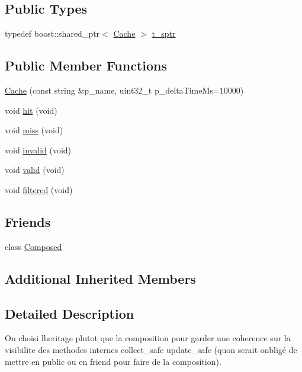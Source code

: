 \subsection*{Public Types}
\begin{DoxyCompactItemize}
\item 
typedef boost\+::shared\+\_\+ptr$<$ \hyperlink{classxtd_1_1counters_1_1Cache}{Cache} $>$ \hyperlink{classxtd_1_1counters_1_1Cache_ad248c57507dbfd4b90332551fd0d5f1b}{t\+\_\+sptr}
\end{DoxyCompactItemize}
\subsection*{Public Member Functions}
\begin{DoxyCompactItemize}
\item 
\hyperlink{classxtd_1_1counters_1_1Cache_a73df8a43eff5fd364e41dccabc562d54}{Cache} (const string \&p\+\_\+name, uint32\+\_\+t p\+\_\+delta\+Time\+Ms=10000)
\item 
void \hyperlink{classxtd_1_1counters_1_1Cache_a57101c273f95f2cf4d5a71627f0b23de}{hit} (void)
\item 
void \hyperlink{classxtd_1_1counters_1_1Cache_a71c25293724fa534633e6d5c9f2cc36d}{miss} (void)
\item 
void \hyperlink{classxtd_1_1counters_1_1Cache_a419b5620c93818158193cb6aca015c9b}{invalid} (void)
\item 
void \hyperlink{classxtd_1_1counters_1_1Cache_a42ea3f207a0399b1864f3ee918e8a0e4}{valid} (void)
\item 
void \hyperlink{classxtd_1_1counters_1_1Cache_a827a66e44b127d38c5f808fa38a2535a}{filtered} (void)
\end{DoxyCompactItemize}
\subsection*{Friends}
\begin{DoxyCompactItemize}
\item 
class \hyperlink{classxtd_1_1counters_1_1Cache_a93e934ad70d5b32b14beed5572450abf}{Composed}
\end{DoxyCompactItemize}
\subsection*{Additional Inherited Members}


\subsection{Detailed Description}
On choisi l\textquotesingle{}heritage plutot que la composition pour garder une coherence sur la visibilite des methodes internes collect\+\_\+safe update\+\_\+safe (qu\textquotesingle{}on serait onbligé de mettre en public ou en friend pour faire de la composition). 

